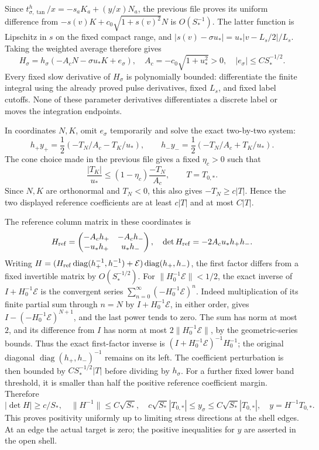 \documentclass[10pt,a4paper]{article}
\begin{document}
Since \(t_{\sigma,\tan}^h/x=-s_aK_a+(y/x)N_a\), the previous file proves its uniform difference from \(-s(v)K+c_0\sqrt{1+s(v)^2}N\) is \(O(S_*^{-1})\). The latter function is Lipschitz in \(s\) on the fixed compact range, and \(|s(v)-\sigma u_*|=u_*|v-L_s/2|/L_s\). Taking the weighted average therefore gives \[
H_\sigma=h_\sigma(-A_cN-\sigma u_*K+e_\sigma),\quad
A_c=-c_0\sqrt{1+u_*^2}>0,\quad |e_\sigma|\le CS_*^{-1/2}.
\] Every fixed slow derivative of \(H_\sigma\) is polynomially bounded: differentiate the finite integral using the already proved pulse derivatives, fixed \(L_s\), and fixed label cutoffs. None of these parameter derivatives differentiates a discrete label or moves the integration endpoints.

In coordinates \(N,K\), omit \(e_\sigma\) temporarily and solve the exact two-by-two system: \[
h_+y_+=\frac12(-T_N/A_c-T_K/u_*),\qquad
h_-y_-=\frac12(-T_N/A_c+T_K/u_*).
\] The cone choice made in the previous file gives a fixed \(\eta_c>0\) such that \[
\frac{|T_K|}{u_*}\le(1-\eta_c)\frac{-T_N}{A_c},
\qquad T=T_{0,*}.
\] Since \(N,K\) are orthonormal and \(T_N<0\), this also gives \(-T_N\ge c|T|\). Hence the two displayed reference coefficients are at least \(c|T|\) and at most \(C|T|\).

The reference column matrix in these coordinates is \[
H_{\rm ref}=
\begin{pmatrix}-A_ch_+&-A_ch_-\\-u_*h_+&u_*h_-\end{pmatrix},
\quad
\det H_{\rm ref}=-2A_cu_*h_+h_-.
\] Writing \(H=(H_{\rm ref}\operatorname{diag}(h_+^{-1},h_-^{-1})+
\mathcal E)\operatorname{diag}(h_+,h_-)\), the first factor differs from a fixed invertible matrix by \(O(S_*^{-1/2})\). For \(\|H_0^{-1}\mathcal E\|<1/2\), the exact inverse of
\(I+H_0^{-1}\mathcal E\) is the convergent series
\(\sum_{n=0}^{\infty}(-H_0^{-1}\mathcal E)^n\).
Indeed multiplication of its finite partial sum through \(n=N\) by
\(I+H_0^{-1}\mathcal E\), in either order, gives
\(I-(-H_0^{-1}\mathcal E)^{N+1}\), and the last power tends to zero.
The sum has norm at most \(2\), and its difference from \(I\) has norm
at most \(2\|H_0^{-1}\mathcal E\|\), by the geometric-series bounds.
Thus the exact first-factor inverse is
\((I+H_0^{-1}\mathcal E)^{-1}H_0^{-1}\); the original diagonal
\(\operatorname{diag}(h_+,h_-)^{-1}\) remains on its left. The coefficient perturbation is then bounded by \(CS_*^{-1/2}|T|\) before dividing by \(h_\sigma\). For a further fixed lower band threshold, it is smaller than half the positive reference coefficient margin. Therefore \[
|\det H|\ge c/S_*,\quad \|H^{-1}\|\le C\sqrt{S_*},\quad
c\sqrt{S_*}|T_{0,*}|\le y_\sigma\le C\sqrt{S_*}|T_{0,*}|,
\quad y=H^{-1}T_{0,*}.
\] This proves positivity uniformly up to limiting stress directions at the shell edges. At an edge the actual target is zero; the positive inequalities for \(y\) are asserted in the open shell.
\end{document}
